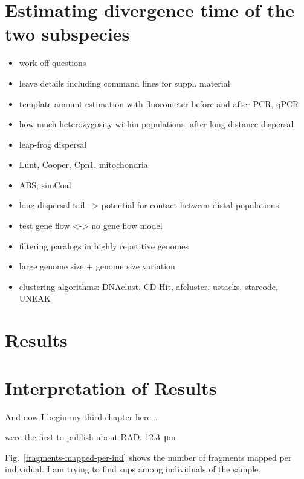 \documentclass[a4paper,12pt,times,print,index,custombib,custommargin]{PhDThesisPSnPDF}\usepackage[]{graphicx}\usepackage[]{color}
\begin{document}
\begin{landscape}
\end{landscape}



\section{Estimating divergence time of the two subspecies}

\begin{itemize}
\item work off questions
\item leave details including command lines for suppl. material
\item template amount estimation with fluorometer before and after PCR, qPCR
\item how much heterozygosity within populations, after long distance dispersal
\item leap-frog dispersal
\item Lunt, Cooper, Cpn1, mitochondria
\item ABS, simCoal
\item long dispersal tail --> potential for contact between distal populations
\item test gene flow <-> no gene flow model
\item filtering paralogs in highly repetitive genomes
\item large genome size $+$ genome size variation
\item clustering algorithms: DNAclust, CD-Hit, afcluster, ustacks, starcode, UNEAK
\end{itemize}


\section{Results}

\section{Interpretation of Results}



And now I begin my third chapter here \dots

\cite{Baird2008} were the first to publish about RAD. \SI{12,3}{\micro\metre}

Fig.~\vref{fragments-mapped-per-ind} shows the number of \glspl{fragment} mapped per individual.
I am trying to find \glspl{snp} among individuals of the sample.
\end{document}
